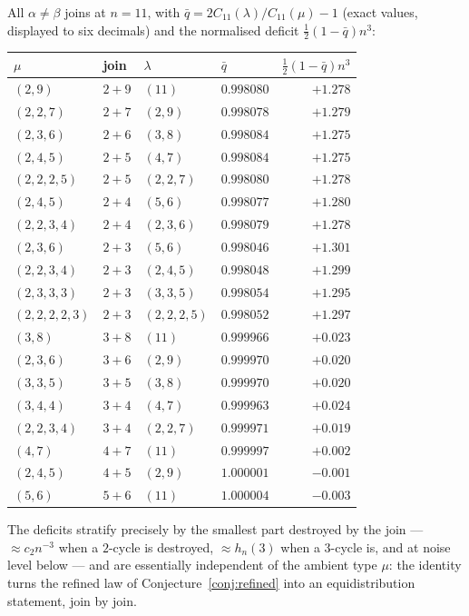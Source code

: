 \documentclass[11pt]{article}
\theoremstyle{definition}
\newcommand{\CC}{C}
\begin{document}
All $\alpha\neq\beta$ joins at $n=11$, with
$\bar q=2\CC_{11}(\lambda)/\CC_{11}(\mu)-1$ (exact values, displayed to six
decimals) and the normalised deficit $\tfrac12(1-\bar q)n^3$:

\begin{center}
\small
\begin{tabular}{llll r}
\toprule
$\mu$ & join & $\lambda$ & $\bar q$ & $\tfrac12(1-\bar q)n^3$\\
\midrule
$(2,9)$ & $2{+}9$ & $(11)$ & $0.998080$ & $+1.278$\\
$(2,2,7)$ & $2{+}7$ & $(2,9)$ & $0.998078$ & $+1.279$\\
$(2,3,6)$ & $2{+}6$ & $(3,8)$ & $0.998084$ & $+1.275$\\
$(2,4,5)$ & $2{+}5$ & $(4,7)$ & $0.998084$ & $+1.275$\\
$(2,2,2,5)$ & $2{+}5$ & $(2,2,7)$ & $0.998080$ & $+1.278$\\
$(2,4,5)$ & $2{+}4$ & $(5,6)$ & $0.998077$ & $+1.280$\\
$(2,2,3,4)$ & $2{+}4$ & $(2,3,6)$ & $0.998079$ & $+1.278$\\
$(2,3,6)$ & $2{+}3$ & $(5,6)$ & $0.998046$ & $+1.301$\\
$(2,2,3,4)$ & $2{+}3$ & $(2,4,5)$ & $0.998048$ & $+1.299$\\
$(2,3,3,3)$ & $2{+}3$ & $(3,3,5)$ & $0.998054$ & $+1.295$\\
$(2,2,2,2,3)$ & $2{+}3$ & $(2,2,2,5)$ & $0.998052$ & $+1.297$\\
\midrule
$(3,8)$ & $3{+}8$ & $(11)$ & $0.999966$ & $+0.023$\\
$(2,3,6)$ & $3{+}6$ & $(2,9)$ & $0.999970$ & $+0.020$\\
$(3,3,5)$ & $3{+}5$ & $(3,8)$ & $0.999970$ & $+0.020$\\
$(3,4,4)$ & $3{+}4$ & $(4,7)$ & $0.999963$ & $+0.024$\\
$(2,2,3,4)$ & $3{+}4$ & $(2,2,7)$ & $0.999971$ & $+0.019$\\
\midrule
$(4,7)$ & $4{+}7$ & $(11)$ & $0.999997$ & $+0.002$\\
$(2,4,5)$ & $4{+}5$ & $(2,9)$ & $1.000001$ & $-0.001$\\
$(5,6)$ & $5{+}6$ & $(11)$ & $1.000004$ & $-0.003$\\
\bottomrule
\end{tabular}
\end{center}

\noindent
The deficits stratify precisely by the smallest part destroyed by the join
--- $\approx c_2 n^{-3}$ when a $2$-cycle is destroyed, $\approx h_n(3)$
when a $3$-cycle is, and at noise level below --- and are essentially
independent of the ambient type $\mu$: the identity turns the refined law of
Conjecture~\ref{conj:refined} into an equidistribution statement, join by
join.
\end{document}

